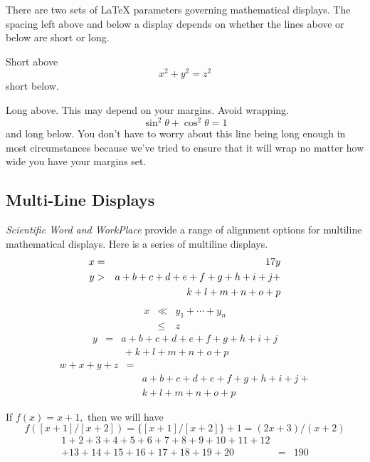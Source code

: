 \documentclass{article}
\begin{document}
There are two sets of \LaTeX{} parameters governing mathematical displays.
The spacing left above and below a display depends on whether the lines
above or below are short or long.

Short above 
\begin{equation*}
x^2+y^2=z^2
\end{equation*}
short below.

Long above. This may depend on your margins. Avoid wrapping. 
\begin{equation*}
\sin ^{2}\theta +\cos ^{2}\theta =1
\end{equation*}
and long below. You don't have to worry about this line being long enough in
most circumstances because we've tried to ensure that it will wrap no matter
how wide you have your margins set.

\subsection{Multi-Line Displays}

\emph{Scientific Word and WorkPlace} provide a range of alignment options
for multiline mathematical displays. Here is a series of multiline displays. 
\begin{eqnarray}
x &=&17y \\
y &>&a+b+c+d+e+f+g+h+i+j+  \notag \\
&&k+l+m+n+o+p
\end{eqnarray}
\begin{eqnarray*}
x &\ll &y_{1}+\cdots +y_{n} \\
&\leq &z
\end{eqnarray*}
\begin{eqnarray*}
y &=&a+b+c+d+e+f+g+h+i+j \\
&&\,+k+l+m+n+o+p
\end{eqnarray*}
\begin{eqnarray*}
w+x+y+z &=& \\
&&a+b+c+d+e+f+g+h+i+j+ \\
&&k+l+m+n+o+p
\end{eqnarray*}

If $f(x)=x+1,$ then we will have 
\begin{equation*}
f([x+1]/[x+2])=\{[x+1]/[x+2]\}+1=(2x+3)/(x+2)
\end{equation*}
\begin{eqnarray*}
1+2+3+4+5+6+7+8+9+10+11+12 && \\
+13+14+15+16+17+18+19+20 &=&190
\end{eqnarray*}
\end{document}
